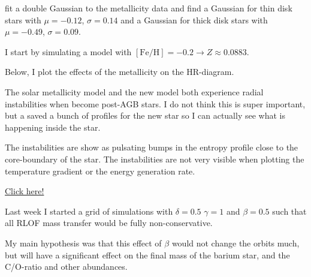 \documentclass[a4paper,10pt]{article}
\begin{document}
\citet{castro2016} fit a double Gaussian to the metallicity data and find a Gaussian for thin disk stars with \(\mu = -0.12\), \(\sigma = 0.14\) and a Gaussian for thick disk stars with \(\mu = -0.49\), \(\sigma = 0.09\).

I start by simulating a model with \([\text{Fe/H}] = -0.2 \to Z \approx 0.0883\).

\begin{figure}[ht]
    \centering
\end{figure}

Below, I plot the effects of the metallicity on the HR-diagram.

\begin{figure}[ht]
    \centering
\end{figure}

The solar metallicity model and the new model both experience radial instabilities when become post-AGB stars. I do not think this is super important, but a saved a bunch of profiles for the new star so I can actually see what is happening inside the star.

\begin{figure}[ht]
    \centering
\end{figure}

The instabilities are show as pulsating bumps in the entropy profile close to the core-boundary of the star.
The instabilities are not very visible when plotting the temperature gradient or the energy generation rate.

\href{https://s-koen.github.io/figures/#/plots/master-internship/w20/post-AGB-instabilities}{Click here!}



Last week I started a grid of simulations with \(\delta =0.5\) \(\gamma =1\) and \(\beta =0.5\) such that all RLOF mass transfer would be fully non-conservative.

My main hypothesis was that this effect of \(\beta \) would not change the orbits much, but will have a significant effect on the final mass of the barium star, and the C/O-ratio and other abundances.
\end{document}
